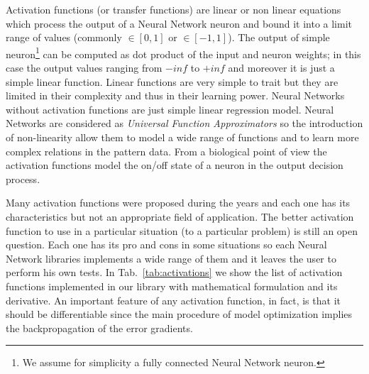 

Activation functions (or transfer functions) are linear or non linear equations which process the output of a Neural Network neuron and bound it into a limit range of values (commonly $\in[0, 1]$ or $\in[-1, 1]$).
The output of simple neuron\footnote{
  We assume for simplicity a fully connected Neural Network neuron.
} can be computed as dot product of the input and neuron weights; in this case the output values ranging from $-inf$ to $+inf$ and moreover it is just a simple linear function.
Linear functions are very simple to trait but they are limited in their complexity and thus in their learning power.
Neural Networks without activation functions are just simple linear regression model.
Neural Networks are considered as \emph{Universal Function Approximators} so the introduction of non-linearity allow them to model a wide range of functions and to learn more complex relations in the pattern data.
From a biological point of view the activation functions model the on/off state of a neuron in the output decision process.

Many activation functions were proposed during the years and each one has its characteristics but not an appropriate field of application.
The better activation function to use in a particular situation (to a particular problem) is still an open question.
Each one has its pro and cons in some situations so each Neural Network libraries implements a wide range of them and it leaves the user to perform his own tests.
In Tab.~\ref{tab:activations} we show the list of activation functions implemented in our library with mathematical formulation and its derivative.
An important feature of any activation function, in fact, is that it should be differentiable since the main procedure of model optimization implies the backpropagation of the error gradients.

